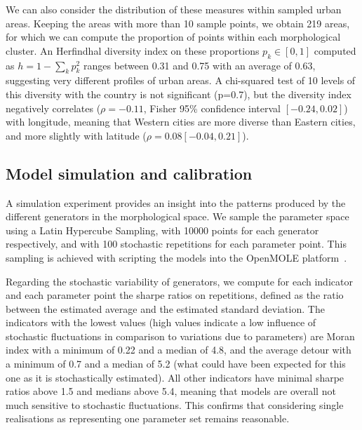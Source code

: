 \documentclass[letterpaper]{article}
\begin{document}
We can also consider the distribution of these measures within sampled urban areas. Keeping the areas with more than 10 sample points, we obtain 219 areas, for which we can compute the proportion of points within each morphological cluster. An Herfindhal diversity index on these proportions $p_k \in \left[0,1\right]$ computed as $h = 1 - \sum_k p_k^2$ ranges between 0.31 and 0.75 with an average of 0.63, suggesting very different profiles of urban areas. A chi-squared test of 10 levels of this diversity with the country is not significant (p=0.7), but the diversity index negatively correlates ($\rho = -0.11$, Fisher 95\% confidence interval $\left[-0.24,0.02\right]$) with longitude, meaning that Western cities are more diverse than Eastern cities, and more slightly with latitude ($\rho = 0.08 \left[-0.04,0.21\right]$).




\subsection{Model simulation and calibration}



A simulation experiment provides an insight into the patterns produced by the different generators in the morphological space. We sample the parameter space using a Latin Hypercube Sampling, with 10000 points for each generator respectively, and with 100 stochastic repetitions for each parameter point. This sampling is achieved with scripting the models into the OpenMOLE platform~\citep{reuillon2013openmole}.

Regarding the stochastic variability of generators, we compute for each indicator and each parameter point the sharpe ratios on repetitions, defined as the ratio between the estimated average and the estimated standard deviation. The indicators with the lowest values (high values indicate a low influence of stochastic fluctuations in comparison to variations due to parameters) are Moran index with a minimum of 0.22 and a median of 4.8, and the average detour with a minimum of 0.7 and a median of 5.2 (what could have been expected for this one as it is stochastically estimated). All other indicators have minimal sharpe ratios above 1.5 and medians above 5.4, meaning that models are overall not much sensitive to stochastic fluctuations. This confirms that considering single realisations as representing one parameter set remains reasonable.
\end{document}
